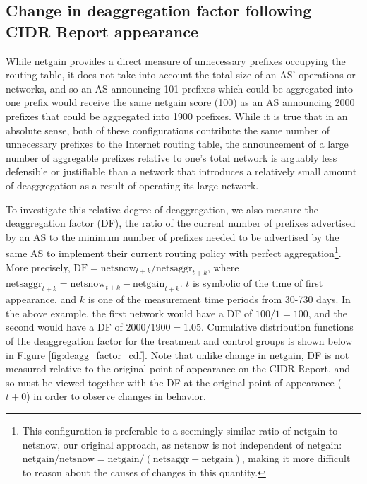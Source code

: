\subsection{Change in deaggregation factor following CIDR Report appearance}

While netgain provides a direct measure of unnecessary prefixes occupying the
routing table, it does not take into account the total size of an AS'
operations or networks, and so an AS announcing 101 prefixes which could be
aggregated into one prefix would receive the same netgain score (100) as an AS
announcing 2000 prefixes that could be aggregated into 1900 prefixes. While it
is true that in an absolute sense, both of these configurations contribute the
same number of unnecessary prefixes to the Internet routing table, the
announcement of a large number of aggregable prefixes relative to one's total
network is arguably less defensible or justifiable than a network that
introduces a relatively small amount of deaggregation as a result of operating
its large network.

To investigate this relative degree of deaggregation, we also measure the
deaggregation factor (DF), the ratio of the current number of prefixes
advertised by an AS to the minimum number of prefixes needed to be advertised
by the same AS to implement their current routing policy with perfect
aggregation\footnote{This configuration is preferable to a seemingly similar
ratio of netgain to netsnow, our original approach, as netsnow is not
independent of netgain:
$\textrm{netgain}/\textrm{netsnow} =
\textrm{netgain}/(\textrm{netsaggr}+\textrm{netgain})$, making it more
difficult to reason about the causes of changes in this quantity.}.
More precisely,
$\textrm{DF}=\textrm{netsnow}_{t+k}/\textrm{netsaggr}_{t+k}$, where
$\textrm{netsaggr}_{t+k}=\textrm{netsnow}_{t+k}-\textrm{netgain}_{t+k}$. $t$ is
symbolic of the time of first appearance, and $k$ is one of the measurement
time periods from 30-730 days. In the above example, the first network would
have a DF of $\textrm{100}/\textrm{1}=\textrm{100}$, and the second would have
a DF of $\textrm{2000}/\textrm{1900}=\textrm{1.05}$. Cumulative distribution
functions of the deaggregation factor for the treatment and control groups is
shown below in Figure \ref{fig:deagg_factor_cdf}. Note that unlike change in
netgain, DF is not measured relative to the original point of appearance on the
CIDR Report, and so must be viewed together with the DF at the original point
of appearance ($t+0$) in order to observe changes in behavior.


